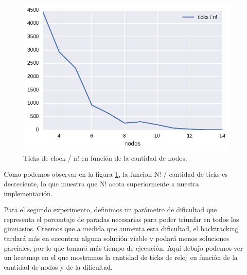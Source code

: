 \begin{figure}[H]
  \begin{center}
    \includegraphics[scale = 0.5]{imagenes/ej1_complejidad.pdf}
    \caption{Ticks de clock / n! en función de la cantidad de nodos.}
    \label{fig:ej1_complejidad}
  \end{center}
\end{figure}

Como podemos observar en la figura \ref{fig:ej1_complejidad}, la funcion N! / cantidad de ticks es decreciente, lo que muestra que N! acota superiormente a nuestra implementación.

Para el segundo experimento, definimos un parámetro de dificultad que representa el porcentaje de paradas necesarias para poder triunfar en todos los gimnasios. Creemos que a medida que aumenta esta dificultad, el backtracking tardará más en encontrar alguna solución viable y podará menos soluciones parciales, por lo que tomará más tiempo de ejecución.
Aquí debajo podemos ver un heatmap en el que mostramos la cantidad de ticks de reloj en función de la cantidad de nodos y de la dificultad.

